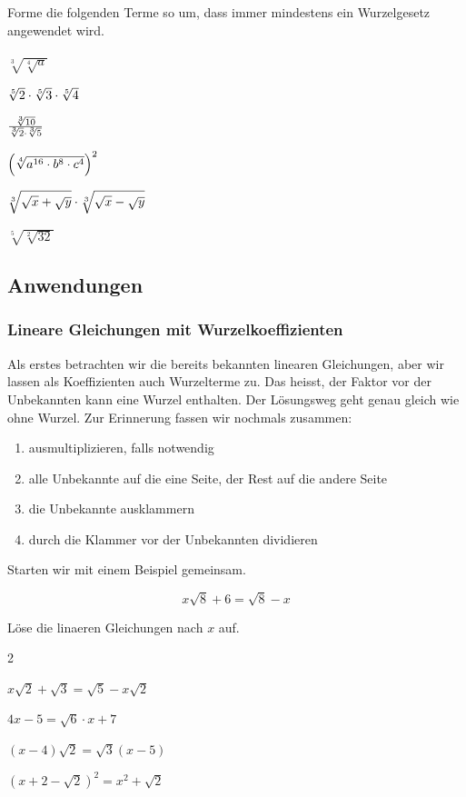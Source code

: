 \documentclass[11pt,oneside]{article}
\begin{document}
	\begin{aufgabe}
		Forme die folgenden Terme so um, dass immer mindestens ein Wurzelgesetz angewendet wird.
		\begin{enumcols}[2]
			\item $\sqrt[3]{\sqrt[4]{a}}$
			\item $\sqrt[5]{2}\cdot\sqrt[5]{3}\cdot\sqrt[5]{4}$
			\item $\frac{\sqrt[3]{10}}{\sqrt[3]{2}\cdot\sqrt[3]{5}}$
			\item $\left(\sqrt[4]{a^{16}\cdot b^8\cdot c^4}\right)^2$
			\item $\sqrt[3]{\sqrt{x}+\sqrt{y}}\cdot\sqrt[3]{\sqrt{x}-\sqrt{y}}$
			\item $\sqrt[5]{\sqrt[2]{32}}$
		\end{enumcols}
	\end{aufgabe}\newpage

\subsection{Anwendungen}
\subsubsection{Lineare Gleichungen mit Wurzelkoeffizienten}
	Als erstes betrachten wir die bereits bekannten linearen Gleichungen, aber wir lassen als Koeffizienten auch Wurzelterme zu. Das heisst, der Faktor vor der Unbekannten kann eine Wurzel enthalten. Der Lösungsweg geht genau gleich wie ohne Wurzel. Zur Erinnerung fassen wir nochmals zusammen:
	\begin{algo}
		\begin{enumerate}
			\item ausmultiplizieren, falls notwendig
			\item alle Unbekannte auf die eine Seite, der Rest auf die andere Seite
			\item die Unbekannte ausklammern
			\item durch die Klammer vor der Unbekannten dividieren
		\end{enumerate}
	\end{algo}
	Starten wir mit einem Beispiel gemeinsam.
	\begin{beispiel}
		\[x\sqrt{8}+6=\sqrt{8}-x\]
		\karos{4}
	\end{beispiel}
	\begin{aufgabe}
		Löse die linaeren Gleichungen nach $x$ auf.
		\begin{enumerate}[label=\alph*)]\end{enumerate}
	\end{aufgabe}
\end{document}
